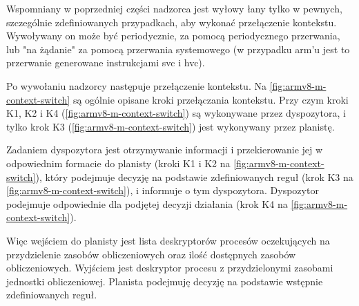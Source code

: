 \documentclass[../../main]{subfiles}
\begin{document}
Wspomniany w poprzedniej części nadzorca jest wyłowy łany tylko w pewnych, szczególnie zdefiniowanych przypadkach, aby wykonać przełączenie kontekstu. Wywoływany on może być periodycznie, za pomocą periodycznego przerwania, lub "na żądanie" za pomocą przerwania systemowego (w przypadku \acrshort{arm}'u jest to przerwanie generowane instrukcjami \acrshort{svc} i \acrshort{hvc}).

Po wywołaniu nadzorcy następuje przełączenie kontekstu. Na \cref{fig:armv8-m-context-switch} są ogólnie opisane kroki przełączania kontekstu. Przy czym kroki K1, K2 i K4 (\cref{fig:armv8-m-context-switch}) są wykonywane przez dyspozytora, i tylko krok K3 (\cref{fig:armv8-m-context-switch}) jest wykonywany przez planistę.

Zadaniem dyspozytora jest otrzymywanie informacji i przekierowanie jej w odpowiednim formacie do planisty (kroki K1 i K2 na \cref{fig:armv8-m-context-switch}), który podejmuje decyzję na podstawie zdefiniowanych reguł (krok K3 na \cref{fig:armv8-m-context-switch}), i informuje o tym dyspozytora. Dyspozytor podejmuje odpowiednie dla podjętej decyzji działania (krok K4 na \cref{fig:armv8-m-context-switch}).

Więc wejściem do planisty jest lista deskryptorów procesów oczekujących na przydzielenie zasobów obliczeniowych oraz ilość dostępnych zasobów obliczeniowych. Wyjściem jest deskryptor procesu z przydzielonymi zasobami jednostki obliczeniowej. Planista podejmuję decyzję na podstawie wstępnie zdefiniowanych reguł.
\end{document}
